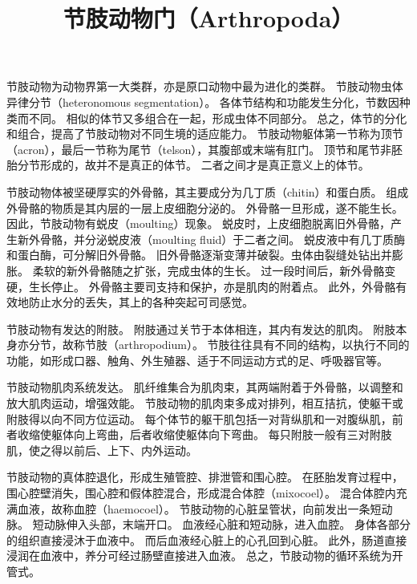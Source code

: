 \documentclass[11pt]{article}
\title{节肢动物门（Arthropoda）}
\date{}
\begin{document}
  \maketitle

  \linenumbers
节肢动物为动物界第一大类群，亦是原口动物中最为进化的类群。
节肢动物虫体异律分节（heteronomous segmentation）。
各体节结构和功能发生分化，节数因种类而不同。
相似的体节又多组合在一起，形成虫体不同部分。
总之，体节的分化和组合，提高了节肢动物对不同生境的适应能力。
节肢动物躯体第一节称为顶节（acron），最后一节称为尾节（telson），其腹部或末端有肛门。
顶节和尾节非胚胎分节形成的，故并不是真正的体节。
二者之间才是真正意义上的体节。

\newline

节肢动物体被坚硬厚实的外骨骼，其主要成分为几丁质（chitin）和蛋白质。
组成外骨骼的物质是其内层的一层上皮细胞分泌的。
外骨骼一旦形成，遂不能生长。
因此，节肢动物有蜕皮（moulting）现象。
蜕皮时，上皮细胞脱离旧外骨骼，产生新外骨骼，并分泌蜕皮液（moulting fluid）于二者之间。
蜕皮液中有几丁质酶和蛋白酶，可分解旧外骨骼。
旧外骨骼逐渐变薄并破裂。虫体由裂缝处钻出并膨胀。
柔软的新外骨骼随之扩张，完成虫体的生长。
过一段时间后，新外骨骼变硬，生长停止。
外骨骼主要司支持和保护，亦是肌肉的附着点。
此外，外骨骼有效地防止水分的丢失，其上的各种突起可司感觉。

\newline

节肢动物有发达的附肢。
附肢通过关节于本体相连，其内有发达的肌肉。
附肢本身亦分节，故称节肢（arthropodium）。
节肢往往具有不同的结构，以执行不同的功能，如形成口器、触角、外生殖器、适于不同运动方式的足、呼吸器官等。

\newline

节肢动物肌肉系统发达。
肌纤维集合为肌肉束，其两端附着于外骨骼，以调整和放大肌肉运动，增强效能。
节肢动物的肌肉束多成对排列，相互拮抗，使躯干或附肢得以向不同方位运动。
每个体节的躯干肌包括一对背纵肌和一对腹纵肌，前者收缩使躯体向上弯曲，后者收缩使躯体向下弯曲。
每只附肢一般有三对附肢肌，使之得以前后、上下、内外运动。

\newline

节肢动物的真体腔退化，形成生殖管腔、排泄管和围心腔。
在胚胎发育过程中，围心腔壁消失，围心腔和假体腔混合，形成混合体腔（mixocoel）。
混合体腔内充满血液，故称血腔（haemocoel）。
节肢动物的心脏呈管状，向前发出一条短动脉。
短动脉伸入头部，末端开口。
血液经心脏和短动脉，进入血腔。
身体各部分的组织直接浸沐于血液中。
而后血液经心脏上的心孔回到心脏。
此外，肠道直接浸润在血液中，养分可经过肠壁直接进入血液。
总之，节肢动物的循环系统为开管式。
\end{document}
